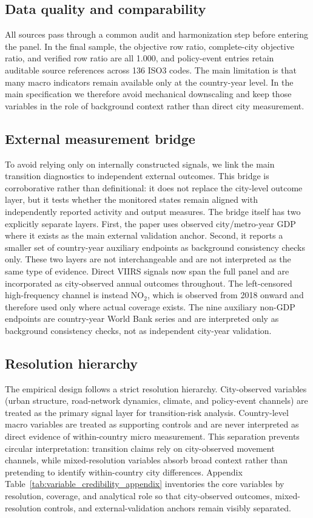 \documentclass[11pt,a4paper]{article}
\begin{document}
\subsection{Data quality and comparability}
All sources pass through a common audit and harmonization step before entering the panel.
In the final sample, the objective row ratio, complete-city objective ratio, and verified row ratio are all 1.000, and policy-event entries retain auditable source references across 136 ISO3 codes.
The main limitation is that many macro indicators remain available only at the country-year level.
In the main specification we therefore avoid mechanical downscaling and keep those variables in the role of background context rather than direct city measurement.

\subsection{External measurement bridge}
To avoid relying only on internally constructed signals, we link the main transition diagnostics to independent external outcomes.
This bridge is corroborative rather than definitional: it does not replace the city-level outcome layer, but it tests whether the monitored states remain aligned with independently reported activity and output measures.
The bridge itself has two explicitly separate layers.
First, the paper uses observed city/metro-year GDP where it exists as the main external validation anchor.
Second, it reports a smaller set of country-year auxiliary endpoints as background consistency checks only.
These two layers are not interchangeable and are not interpreted as the same type of evidence.
Direct VIIRS signals now span the full panel and are incorporated as city-observed annual outcomes throughout.
The left-censored high-frequency channel is instead NO$_2$, which is observed from 2018 onward and therefore used only where actual coverage exists.
The nine auxiliary non-GDP endpoints are country-year World Bank series and are interpreted only as background consistency checks, not as independent city-year validation.

\subsection{Resolution hierarchy}
The empirical design follows a strict resolution hierarchy.
City-observed variables (urban structure, road-network dynamics, climate, and policy-event channels) are treated as the primary signal layer for transition-risk analysis.
Country-level macro variables are treated as supporting controls and are never interpreted as direct evidence of within-country micro measurement.
This separation prevents circular interpretation: transition claims rely on city-observed movement channels, while mixed-resolution variables absorb broad context rather than pretending to identify within-country city differences.
Appendix Table~\ref{tab:variable_credibility_appendix} inventories the core variables by resolution, coverage, and analytical role so that city-observed outcomes, mixed-resolution controls, and external-validation anchors remain visibly separated.
\end{document}
